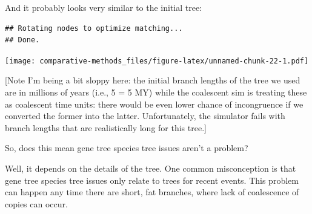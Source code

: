 \documentclass[]{article}
\newenvironment{Shaded}{\begin{snugshade}}{\end{snugshade}}
\newcommand{\DecValTok}[1]{\textcolor[rgb]{0.00,0.00,0.81}{#1}}
\newcommand{\KeywordTok}[1]{\textcolor[rgb]{0.13,0.29,0.53}{\textbf{#1}}}
\newcommand{\NormalTok}[1]{#1}
\newcommand{\OperatorTok}[1]{\textcolor[rgb]{0.81,0.36,0.00}{\textbf{#1}}}
\newcommand{\StringTok}[1]{\textcolor[rgb]{0.31,0.60,0.02}{#1}}
\begin{document}
And it probably looks very similar to the initial tree:

\begin{Shaded}
\end{Shaded}

\begin{verbatim}
## Rotating nodes to optimize matching...
## Done.
\end{verbatim}

\texttt{[image: comparative-methods\_files/figure-latex/unnamed-chunk-22-1.pdf]}

{[}Note I'm being a bit sloppy here: the initial branch lengths of the tree we used are in millions of years (i.e., 5 = 5 MY) while the coalescent sim is treating these as coalescent time units: there would be even lower chance of incongruence if we converted the former into the latter. Unfortunately, the simulator fails with branch lengths that are realistically long for this tree.{]}

So, does this mean gene tree species tree issues aren't a problem?

Well, it depends on the details of the tree. One common misconception is that gene tree species tree issues only relate to trees for recent events. This problem can happen any time there are short, fat branches, where lack of coalescence of copies can occur.

\begin{Shaded}
\end{Shaded}
\end{document}
